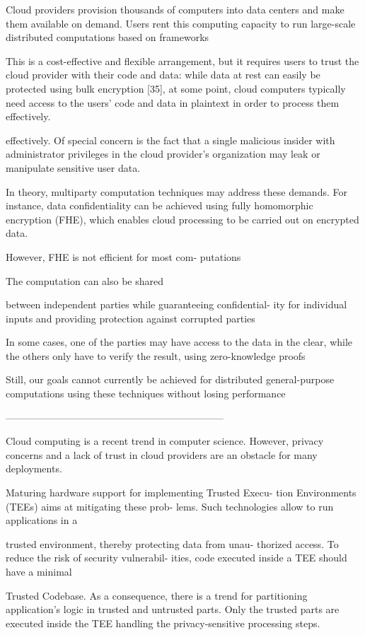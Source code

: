Cloud providers provision thousands of computers into data
centers and make them available on demand. Users rent this
computing capacity to run large-scale distributed computations
based on frameworks

This is a
cost-effective and flexible arrangement, but it requires users to
trust the cloud provider with their code and data: while data
at rest can easily be protected using bulk encryption [35],
at some point, cloud computers typically need access to
the users’ code and data in plaintext in order to process
them effectively.

effectively. Of special concern is the fact that a single
malicious insider with administrator privileges in the cloud
provider’s organization may leak or manipulate sensitive user
data.

In theory, multiparty computation techniques may address
these demands. For instance, data confidentiality can be
achieved using fully homomorphic encryption (FHE), which
enables cloud processing to be carried out on encrypted data.

However, FHE is not efficient for most com-
putations

The computation can also be shared

between independent parties while guaranteeing confidential-
ity for individual inputs and providing protection against corrupted parties

In some cases, one of the parties may have
access to the data in the clear, while the others only have
to verify the result, using zero-knowledge proofs

Still, our goals
cannot currently be achieved for distributed general-purpose
computations using these techniques without losing performance

------------------------------------------------------------------

Cloud computing is a recent trend in computer science.
However, privacy concerns and a lack of trust in cloud
providers are an obstacle for many deployments.

Maturing hardware support for implementing Trusted Execu-
tion Environments (TEEs) aims at mitigating these prob-
lems. Such technologies allow to run applications in a

trusted environment, thereby protecting data from unau-
thorized access. To reduce the risk of security vulnerabil-
ities, code executed inside a TEE should have a minimal

Trusted Codebase. As a consequence, there is a trend for
partitioning application’s logic in trusted and untrusted
parts. Only the trusted parts are executed inside the TEE
handling the privacy-sensitive processing steps.

